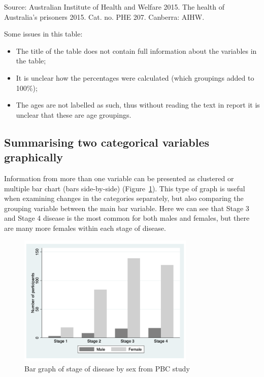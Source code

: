 \documentclass[
  a4paper,
]{memoir}
\providecommand{\tightlist}{%
  \setlength{\itemsep}{0pt}\setlength{\parskip}{0pt}}\usepackage{longtable,booktabs,array}
\begin{document}
Source: Australian Institute of Health and Welfare 2015. The health of
Australia's prisoners 2015. Cat. no. PHE 207. Canberra: AIHW.

Some issues in this table:

\begin{itemize}
\tightlist
\item
  The title of the table does not contain full information about the
  variables in the table;
\item
  It is unclear how the percentages were calculated (which groupings
  added to 100\%);
\item
  The ages are not labelled as such, thus without reading the text in
  report it is unclear that these are age groupings.
\end{itemize}

\hypertarget{summarising-two-categorical-variables-graphically}{%
\subsection{Summarising two categorical variables
graphically}\label{summarising-two-categorical-variables-graphically}}

Information from more than one variable can be presented as clustered or
multiple bar chart (bars side-by-side) (Figure~\ref{fig-bar-2}). This
type of graph is useful when examining changes in the categories
separately, but also comparing the grouping variable between the main
bar variable. Here we can see that Stage 3 and Stage 4 disease is the
most common for both males and females, but there are many more females
within each stage of disease.

\begin{figure}[H]

{\centering \includegraphics[width=0.75\textwidth,height=\textheight]{img/mod01/pbc-bar-stage-sex.png}

}

\caption{\label{fig-bar-2}Bar graph of stage of disease by sex from PBC
study}

\end{figure}
\end{document}
